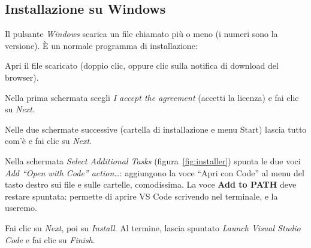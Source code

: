 \subsection{Installazione su Windows}

Il pulsante \textit{Windows} scarica un file chiamato più o meno
 (i numeri sono la versione). È un
normale programma di installazione:

\begin{passi}
  \item Apri il file scaricato (doppio clic, oppure clic sulla notifica di
        download del browser).
  \item Nella prima schermata scegli \textit{I accept the agreement} (accetti
        la licenza) e fai clic su \textit{Next}.
  \item Nelle due schermate successive (cartella di installazione e menu
        Start) lascia tutto com'è e fai clic su \textit{Next}.
  \item Nella schermata \textit{Select Additional Tasks}
        (figura~\ref{fig:installer}) spunta le due voci \textit{Add “Open
        with Code” action\dots}: aggiungono la voce “Apri con Code” al
        menu del tasto destro sui file e sulle cartelle, comodissima. La voce
        \textbf{Add to PATH} deve restare spuntata: permette di aprire VS
        Code scrivendo  nel terminale, e la useremo.
  \item Fai clic su \textit{Next}, poi su \textit{Install}. Al termine,
        lascia spuntato \textit{Launch Visual Studio Code} e fai clic su
        \textit{Finish}.
\end{passi}

